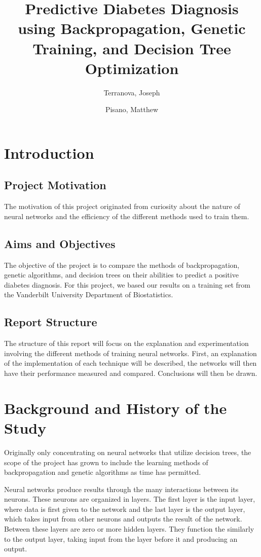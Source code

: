 \documentclass[12pt]{article}
\title{\bf{Predictive Diabetes Diagnosis using Backpropagation, 
Genetic Training, and Decision Tree Optimization}}
\author{
    Terranova, Joseph\\
    \and
    Pisano, Matthew\\
}
\date{\DTMusedate{date}}
\begin{document}
\maketitle

\section{Introduction}
    \subsection{Project Motivation}
        The motivation of this project originated from curiosity about the nature of neural 
        networks and the efficiency of the different methods used to train them.
    \subsection{Aims and Objectives}
        The objective of the project is to compare the methods of backpropagation, genetic 
        algorithms, and decision trees on their abilities to predict a positive diabetes diagnosis.  For
        this project, we based our results on a training set from the Vanderbilt University Department of Biostatistics.
    \subsection{Report Structure}
        The structure of this report will focus on the explanation and experimentation involving the
        different methods of training neural networks.  First, an explanation of the implementation of each technique
        will be described, the networks will then have their performance measured and compared.  Conclusions will
        then be drawn.
\section{Background and History of the Study}
    Originally only concentrating on neural networks that utilize decision trees, 
    the scope of the project has grown to include the learning methods of backpropagation and 
    genetic algorithms as time has permitted.
    
    Neural networks produce results through the many interactions 
    between its neurons.  These neurons are organized in layers. The first layer is the input layer, 
    where data is first given to the network and the last layer is the output layer, which takes input 
    from other neurons and outputs the result of the network.  Between these layers are zero or more 
    hidden layers.  They function the similarly to the output layer, taking input from the layer before it 
    and producing an output.
    
\end{document}
